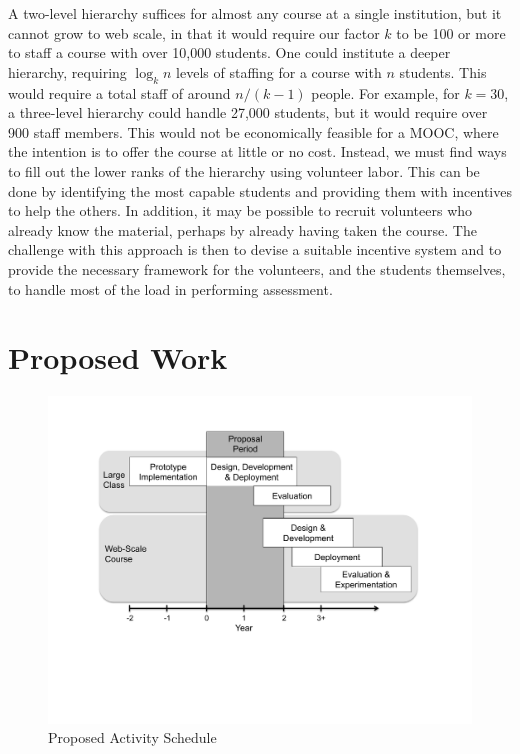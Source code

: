 \documentclass[12pt]{article}
\begin{document}
A two-level hierarchy suffices for almost any course at a single
institution, but it cannot grow to web scale, in that it would require
our factor $k$ to be 100 or more to staff a course with over 10,000
students.  One could institute a deeper hierarchy,
requiring $\log_k n$ levels of staffing for a course with $n$ students.
This would require a
total staff of around $n/(k-1)$ people.  For example, for $k = 30$, a
three-level hierarchy could handle 27,000 students, but it would
require over 900 staff members.  This would not be economically feasible
for a MOOC, where the intention is to offer the course at little or no
cost.  Instead, we must find ways to fill out the lower ranks of the
hierarchy using volunteer labor.  This can be done by identifying the
most capable students and providing them with incentives to help the
others.  In addition, it may be possible to recruit volunteers who
already know the material, perhaps by already having taken the course.
The challenge with this approach is then to devise a suitable
incentive system and to provide the necessary framework for the
volunteers, and the students themselves, to handle most of the load in
performing assessment.

\section{Proposed Work}

\begin{figure}[ht]
\begin{center}
\includegraphics[scale=0.7]{schedule}
\end{center}
\caption{Proposed Activity Schedule}
\label{fig:schedule}
\end{figure}
\end{document}
